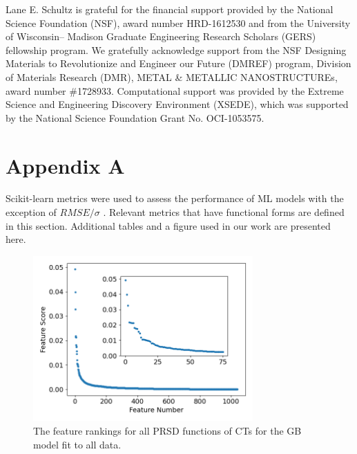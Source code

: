 \documentclass[11pt,a4paper]{article}
\begin{document}
\par
Lane E. Schultz is grateful for the financial support provided by the National Science Foundation (NSF), award number HRD-1612530 and from the University of Wisconsin– Madison Graduate Engineering Research Scholars (GERS) fellowship program. We gratefully acknowledge support from the NSF Designing Materials to Revolutionize and Engineer our Future (DMREF) program, Division of Materials Research (DMR), METAL \& METALLIC NANOSTRUCTUREs, award number \#1728933. Computational support was provided by the Extreme Science and Engineering Discovery Environment (XSEDE), which was supported by the National Science Foundation Grant No. OCI-1053575.

\section*{Appendix A}

\par
Scikit-learn metrics were used to assess the performance of ML models with the exception of $RMSE/\sigma$ \cite{scikit-learn}. Relevant metrics that have functional forms are defined in this section. Additional tables and a figure used in our work are presented here.

\setcounter{equation}{0}
\renewcommand{\theequation}{A\arabic{equation}}

\setcounter{table}{0}
\renewcommand{\thetable}{A\arabic{table}}

\setcounter{figure}{0}
\renewcommand{\thefigure}{A\arabic{figure}}

\begin{figure}[H]
\centering
\includegraphics[width=0.75\textwidth]{figures/features.png}
\caption{The feature rankings for all PRSD functions of CTs for the GB model fit to all data.}
\label{features}
\end{figure}
\end{document}
